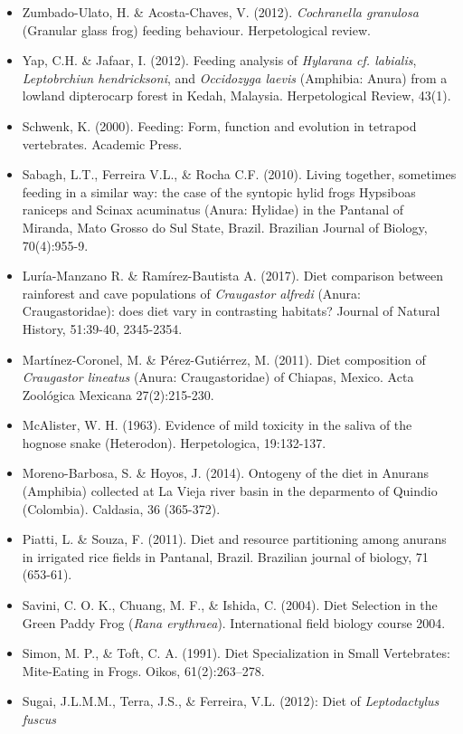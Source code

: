 \documentclass[11pt]{article}
\begin{document}
\begin{itemize}
\item Zumbado-Ulato, H. \& Acosta-Chaves, V. (2012). \textit{Cochranella granulosa} (Granular glass frog) feeding behaviour. Herpetological review.
\item Yap, C.H. \& Jafaar, I. (2012). Feeding analysis of \textit{Hylarana cf. labialis}, \textit{Leptobrchiun hendricksoni}, and \textit{Occidozyga laevis} (Amphibia: Anura) from a lowland dipterocarp forest in Kedah, Malaysia. Herpetological Review, 43(1).
\item Schwenk, K. (2000). Feeding: Form, function and evolution in tetrapod vertebrates. Academic Press.
\item Sabagh, L.T., Ferreira V.L., \& Rocha C.F. (2010). Living together, sometimes feeding in a similar way: the case of the syntopic hylid frogs Hypsiboas raniceps and Scinax acuminatus (Anura: Hylidae) in the Pantanal of Miranda, Mato Grosso do Sul State, Brazil. Brazilian Journal of Biology, 70(4):955-9.
\item Luría-Manzano R. \& Ramírez-Bautista A. (2017). Diet comparison between rainforest and cave populations of \textit{Craugastor alfredi} (Anura: Craugastoridae): does diet vary in contrasting habitats? Journal of Natural History, 51:39-40, 2345-2354.
\item Martínez-Coronel, M. \& Pérez-Gutiérrez, M. (2011). Diet composition of \textit{Craugastor lineatus} (Anura: Craugastoridae) of Chiapas, Mexico. Acta Zoológica Mexicana 27(2):215-230. 
\item McAlister, W. H. (1963). Evidence of mild toxicity in the saliva of the hognose snake (Heterodon). Herpetologica, 19:132-137.
\item Moreno-Barbosa, S. \& Hoyos, J. (2014). Ontogeny of the diet in Anurans (Amphibia) collected at La Vieja river basin in the deparmento of Quindio (Colombia). Caldasia, 36 (365-372).
\item Piatti, L. \& Souza, F. (2011). Diet and resource partitioning among anurans in irrigated rice fields in Pantanal, Brazil. Brazilian journal of biology, 71 (653-61).
\item Savini, C. O. K., Chuang, M. F., \& Ishida, C. (2004). Diet Selection in the Green Paddy Frog (\textit{Rana erythraea}). International field biology course 2004.
\item Simon, M. P., \& Toft, C. A. (1991). Diet Specialization in Small Vertebrates: Mite-Eating in Frogs. Oikos, 61(2):263–278. 
\item Sugai, J.L.M.M., Terra, J.S., \& Ferreira, V.L. (2012): Diet of \textit{Leptodactylus fuscus}

\end{itemize}
\end{document}
